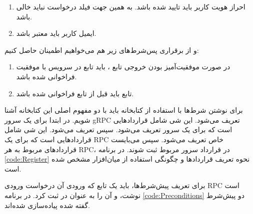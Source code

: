 \begin{enumerate}
\item
احراز هویت کاربر باید تایید شده باشد. به همین جهت فیلد
درخواست نباید خالی باشد.

\item
ایمیل کاربر باید معتبر باشد.
\end{enumerate}


و از برقراری پس‌شرط‌های زیر هم می‌خواهیم اطمینان حاصل کنیم:
\begin{enumerate}
\item
در صورت موفقیت‌آمیز بودن خروجی تابع
، باید تابع
در سرویس
با موفقیت فراخوانی شده باشد.
\item
تابع
باید قبل از تابع
فراخوانی شده باشد.
\end{enumerate}


برای نوشتن شرط‌ها با استفاده از کتابخانه
باید با دو مفهوم اصلی این کتابخانه آشنا شویم. در ابتدا
برای یک سرور gRPC تعریف می‌شود. این شی شامل قراردادهایی است که برای یک سرور تعریف می‌شود. سپس
تعریف می‌شود. این شی شامل قراردادهایی است که برای یک RPC خاص تعریف می‌شود. سپس می‌بایست قراردادهای مربوط به هر RPC، در قرارداد سرور مربوط ثبت شوند. در برنامه 
\ref{code:Register}
نحوه تعریف قراردادها و چگونگی استفاده از میان‌افزار مشخص شده است.

\singlespacing
\begin{figure}
	\begin{LTR}
		
	\end{LTR}
\end{figure}
\doublespacing

برای تعریف پیش‌شرط‌ها، باید یک تابع که ورودی آن درخواست ورودی RPC است نوشت، و آن‌ را به عنوان 
در
ثبت کرد. در برنامه
\ref{code:Preconditions}
دو پیش‌شرط گفته شده پیاده‌سازی شده‌اند.

\singlespacing
\begin{figure}
	\begin{LTR}
		
	\end{LTR}
\end{figure}
\doublespacing


